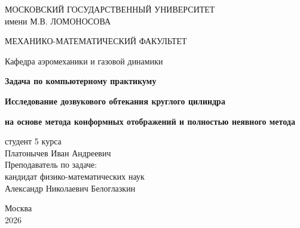 \documentclass[a4paper,12pt]{article}
\begin{document}
	
	\begin{titlepage}
		\begin{center}
			{\Large МОСКОВСКИЙ ГОСУДАРСТВЕННЫЙ УНИВЕРСИТЕТ \\ 
				имени М.В. ЛОМОНОСОВА}
			
			\vspace{0.5cm}
			{\Large МЕХАНИКО-МАТЕМАТИЧЕСКИЙ ФАКУЛЬТЕТ}
			
			\vspace{0.3cm}
			{\large Кафедра аэромеханики и газовой динамики}
			
			\vspace{3cm}
			
			{\Large \textbf{Задача по компьютерному практикуму}}
			
			\vspace{0.5cm}
			{\Large \textbf{Исследование дозвукового обтекания круглого цилиндра}}
			
			\vspace{0.5cm}
			{\large \textbf{на основе метода конформных отображений и полностью неявного метода}}
			
			\vspace{3cm}
			
			\begin{flushright}
				\large
				студент 5 курса \\
				Платонычев Иван Андреевич \\[1cm]
				Преподаватель по задаче: \\
				кандидат физико-математических наук \\
				Александр Николаевич Белоглазкин
			\end{flushright}
			
			\vspace{2cm}
			
			\begin{center}
				\large Москва \\
				\large 2026
			\end{center}
		\end{center}
	\end{titlepage}
	
	\newpage
	\tableofcontents
	\newpage
	
	
	
	
	
	
	
	
	
	
	
	
\end{document}

